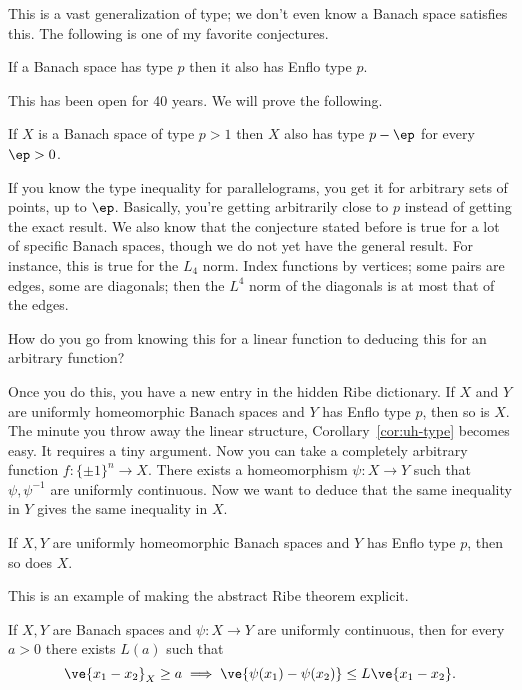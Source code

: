 

This is a vast generalization of type; we don't even know a Banach space satisfies this.
The following is one of my favorite conjectures.
\begin{conj}[Enflo]
If a Banach space has type $p$ then it also has Enflo type $p$.
\end{conj}
This has been open for 40 years. We will prove the following.
\begin{thm}
If $X$ is a Banach space of type $p>1$ then $X$ also has type $p-\ep$ for every $\ep>0$.
\end{thm}
If you know the type inequality for parallelograms, you get it for arbitrary sets of points, up to $\ep$.
Basically, you're getting arbitrarily close to $p$ instead of getting the exact result. 
We also know that the conjecture stated before is true for a lot of specific Banach spaces, though we do not yet have the general result. 
For instance, this is true for the $L_4$ norm.  Index functions by vertices; some pairs are edges, some are diagonals; then the $L^4$ norm of the diagonals is at most that of the edges.

How do you go from knowing this for a linear function to deducing this for an arbitrary function? 

Once you do this, you have a new entry in the hidden Ribe dictionary. If $X$ and $Y$ are uniformly homeomorphic Banach spaces and $Y$ has Enflo type $p$, then so is $X$. The minute you throw away the linear structure, Corollary~\ref{cor:uh-type} becomes easy. It requires a tiny argument. Now you can take a completely arbitrary function $f: \{\pm 1\}^n \to X$. There exists a homeomorphism $\psi: X \to Y$ such that $\psi, \psi^{-1}$ are uniformly continuous. Now we want to deduce that the same inequality in $Y$ gives the same inequality in $X$.  

\begin{pr}
If $X,Y$ are uniformly homeomorphic Banach spaces and $Y$ has Enflo type $p$, then so does $X$.
\end{pr}

This is an example of making the abstract Ribe theorem explicit.
\begin{lem}
If $X,Y$ are Banach spaces and $\psi:X\to Y$ are uniformly continuous, then for every $a>0$ there exists $L(a)$ such that 
\[
\ve{x_1-x_2}_X\ge a \implies \ve{\psi(x_1)-\psi(x_2)}\le L\ve{x_1-x_2}.
\]
\end{lem}

